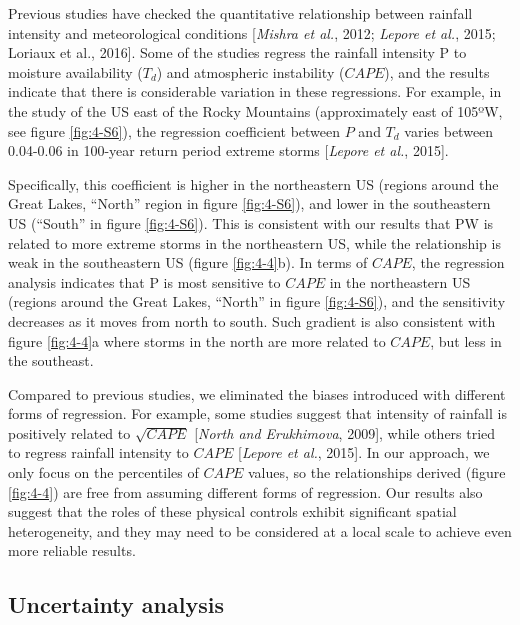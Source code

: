 Previous studies have checked the quantitative relationship between rainfall intensity and meteorological conditions [\textit{Mishra et al.}, 2012; \textit{Lepore et al.}, 2015; Loriaux et al., 2016]. Some of the studies regress the rainfall intensity P to moisture availability ($T_d$) and atmospheric instability ($CAPE$), and the results indicate that there is considerable variation in these regressions. For example, in the study of the US east of the Rocky Mountains (approximately east of 105ºW, see figure \ref{fig:4-S6}), the regression coefficient between $P$ and $T_d$ varies between 0.04-0.06 in 100-year return period extreme storms [\textit{Lepore et al.}, 2015].

Specifically, this coefficient is higher in the northeastern US (regions around the Great Lakes, “North” region in figure \ref{fig:4-S6}), and lower in the southeastern US (“South” in figure \ref{fig:4-S6}). This is consistent with our results that PW is related to more extreme storms in the northeastern US, while the relationship is weak in the southeastern US (figure \ref{fig:4-4}b). In terms of $CAPE$, the regression analysis indicates that P is most sensitive to $CAPE$ in the northeastern US (regions around the Great Lakes, “North” in figure \ref{fig:4-S6}), and the sensitivity decreases as it moves from north to south. Such gradient is also consistent with figure \ref{fig:4-4}a where storms in the north are more related to $CAPE$, but less in the southeast.

Compared to previous studies, we eliminated the biases introduced with different forms of regression. For example, some studies suggest that intensity of rainfall is positively related to $\sqrt{CAPE}$ [\textit{North and Erukhimova}, 2009], while others tried to regress rainfall intensity to $CAPE$ [\textit{Lepore et al.}, 2015]. In our approach, we only focus on the percentiles of $CAPE$ values, so the relationships derived (figure \ref{fig:4-4}) are free from assuming different forms of regression. Our results also suggest that the roles of these physical controls exhibit significant spatial heterogeneity, and they may need to be considered at a local scale to achieve even more reliable results.

\subsection{Uncertainty analysis}

